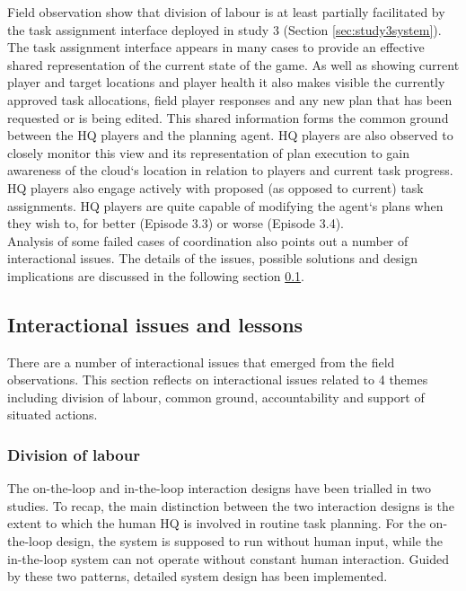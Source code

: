 Field observation show that division of labour is at least partially facilitated by the task assignment interface deployed in study 3 (Section \ref{sec:study3system}). The task assignment interface appears in many cases to provide an effective shared representation of the current state of the game. As well as showing current player and target locations and player health it also makes visible the currently approved task allocations, field player responses and any new plan that has been requested or is being edited. This shared information forms the common ground between the HQ players and the planning agent. HQ players are also observed to closely monitor this view and its representation of plan execution to gain awareness of the cloud`s location in relation to players and current task progress. HQ players also engage actively with proposed (as opposed to current) task assignments. HQ players are quite capable of modifying the agent`s plans when they wish to, for better (Episode 3.3) or worse (Episode 3.4).\\

Analysis of some failed cases of coordination also points out a number of interactional issues. The details of the issues, possible solutions and design implications are discussed in the following section \ref{sec:conclusionIssue}. \\


\subsection{Interactional issues and lessons}\label{sec:conclusionIssue}
There are a number of interactional issues that emerged from the field observations. This section reflects on interactional issues related to 4 themes including division of labour, common ground, accountability and support of situated actions.

\subsubsection{Division of labour}\label{sec:conclusionHH}
The on-the-loop and in-the-loop interaction designs have been trialled in two studies. To recap, the main distinction between the two interaction designs is the extent to which the human HQ is involved in routine task planning. For the on-the-loop design, the system is supposed to run without human input, while the in-the-loop system can not operate without constant human interaction. Guided by these two patterns, detailed system design has been implemented.\\

